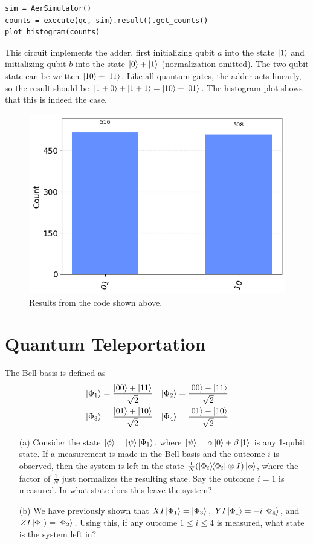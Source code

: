 \documentclass{article}
\begin{document}
{\begin{verbatim}
sim = AerSimulator()
counts = execute(qc, sim).result().get_counts()
plot_histogram(counts)
\end{verbatim}
This circuit implements the adder, first initializing qubit $a$ into the state $\ket{1}$ and initializing qubit $b$ into the state $\ket{0} + \ket{1}$ (normalization omitted). The two qubit state can be written $\ket{10} + \ket{11}$. Like all quantum gates, the adder acts linearly, so the result should be $\ket{1+0} + \ket{1 + 1} = \ket{10} + \ket{01}$. The histogram plot shows that this is indeed the case.

\begin{figure}[hbt!]
    \centering
    \includegraphics[width = .5\textwidth]{scrn-2024-01-03-09-40-24.png}
    \caption{Results from the code shown above.}
\end{figure}
\section*{Quantum Teleportation}
The Bell basis is defined as
\begin{align*}
\ket{\Phi_1} &= \frac{\ket{00} + \ket{11}}{\sqrt{2}} & \ket{\Phi_2} &= \frac{\ket{00} - \ket{11}}{\sqrt{2}} \\
\ket{\Phi_3} &= \frac{\ket{01} + \ket{10}}{\sqrt{2}} & \ket{\Phi_4} &= \frac{\ket{01} - \ket{10}}{\sqrt{2}}
\end{align*}
\begin{itemize}
    \item[(a)] Consider the state $\ket{\phi} = \ket{\psi}\ket{\Phi_1}$, where $\ket{\psi} = \alpha \ket{0}+ \beta\ket{1}$ is any 1-qubit state. If a measurement is made in the Bell basis and the outcome $i$ is observed, then the system is left in the state $\frac{1}{N}(\ketbra{\Phi_i}{\Phi_i}\otimes I) \ket{\phi}$, where the factor of $\frac{1}{N}$ just normalizes the resulting state. Say the outcome $i=1$ is measured. In what state does this leave the system?
    \item[(b)] We have previously shown that $XI\ket{\Phi_1} = \ket{\Phi_3}$, $YI\ket{\Phi_1} = -i\ket{\Phi_4}$, and $ZI\ket{\Phi_1} = \ket{\Phi_2}$. Using this, if any outcome $1 \leq i \leq 4$ is measured, what state is the system left in? 
\end{itemize}

}
\end{document}
